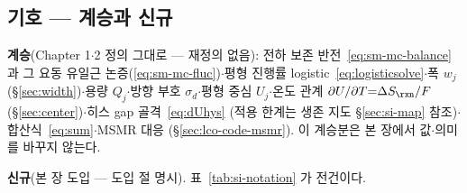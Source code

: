 \subsection*{기호 --- 계승과 신규}
\textbf{계승}(Chapter 1$\cdot$2 정의 그대로 --- 재정의 없음): 전하 보존 반전~\eqref{eq:sm-mc-balance}
과 그 요동 유일근 논증(\eqref{eq:sm-mc-fluc})$\cdot$평형 진행률 logistic~\eqref{eq:logisticsolve}$\cdot$폭
$w_j$(\S\ref{sec:width})$\cdot$용량 $Q_j$$\cdot$방향 부호 $\sigma_d$$\cdot$평형 중심 $U_j$$\cdot$온도 관계
$\partial U/\partial T{=}\Delta S_\rxn/F$(\S\ref{sec:center})$\cdot$히스 gap 골격~\eqref{eq:dUhys}
(적용 한계는 생존 지도 \S\ref{sec:si-map} 참조)$\cdot$합산식~\eqref{eq:sum}$\cdot$MSMR 대응
(\S\ref{sec:lco-code-msmr}). 이 계승분은 본 장에서 값$\cdot$의미를 바꾸지 않는다.

\textbf{신규}(본 장 도입 --- 도입 절 명시). 표~\ref{tab:si-notation} 가 전건이다.

